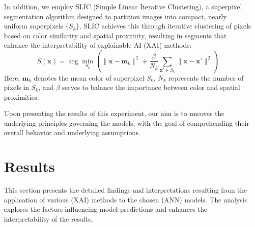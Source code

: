 \documentclass[journal, a4paper]{IEEEtran}
\begin{document}
In addition, we employ SLIC (Simple Linear Iterative Clustering), a superpixel segmentation algorithm designed to partition images into compact, nearly uniform superpixels \( \{ S_k \} \).
SLIC achieves this through iterative clustering of pixels based on color similarity and spatial proximity, resulting in segments that enhance the interpretability of explainable AI (XAI) methods:
\[
    S(\mathbf{x}) = \arg \min_{S_k} \left( \|\mathbf{x} - \mathbf{m}_k\|^2 + \frac{\beta}{N_k} \sum_{\mathbf{x}' \in S_k} \|\mathbf{x} - \mathbf{x}'\|^2 \right)
\]
Here, \( \mathbf{m}_k \) denotes the mean color of superpixel \( S_k \), \( N_k \) represents the number of pixels in \( S_k \), and \( \beta \) serves to balance the importance between color and spatial proximities.

Upon presenting the results of this experiment, our aim is to uncover the underlying principles governing the models, with the goal of comprehending their overall behavior and underlying assumptions.

\section{Results}\label{sec:results}
This section presents the detailed findings and interpretations resulting from the application of various (XAI) methods to the chosen (ANN) models.
The analysis explores the factors influencing model predictions and enhances the interpretability of the results.
\end{document}
